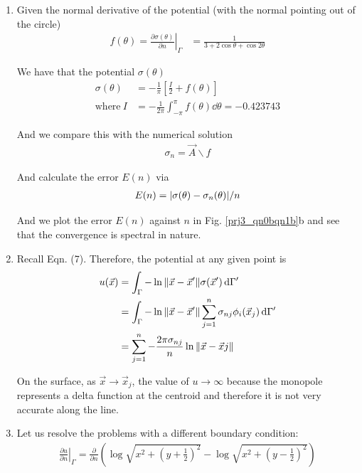 \begin{enumerate}[label=(\alph*),leftmargin=*,itemsep=0mm]
    \item Given the normal derivative of the potential (with the normal pointing out of the circle)
    \begin{align*}
        f(\theta) = \left. \frac{\partial{\sigma}(\theta)}{\partial{n}} \right|_\Gamma
        &= \frac{1}{3+2\cos\theta +\cos2\theta}
    \end{align*}
    
    We have that the potential $\sigma(\theta)$
    \begin{align}
        \sigma(\theta) &= -\frac{1}{\pi} \left[ \frac{I}{2} + f(\theta) \right] \\
        \text{where}\> I &= -\frac{1}{2\pi} \int_{-\pi}^\pi f(\theta) \dd{\theta}
        = -0.423743
    \end{align}
    
    And we compare this with the numerical solution
    \begin{align*}
        \sigma_n = \vec{A} \backslash f
    \end{align*}
    
    And calculate the error $E(n)$ via
    \begin{align*}
        E(n) = \abs{\sigma(\theta)-\sigma_n(\theta)} / n
    \end{align*}
    
    And we plot the error $E(n)$ against $n$ in Fig. \ref{prj3_qn0bqn1b}b and see that the convergence is spectral in nature.
    
    \item Recall Eqn. (7).  Therefore, the potential at any given point is
    \begin{align}
        u(\vec{x}) &= \int_\Gamma -\ln \norm{\vec{x}-\vec{x}'} \sigma(\vec{x}') \dd{\Gamma'} \nonumber \\
        &= \int_\Gamma -\ln \norm{\vec{x}-\vec{x}'} \sum_{j=1}^n \sigma_{nj} \phi_i(\vec{x}_j) \dd{\Gamma'} \nonumber \\
        &= \sum_{j=1}^n -\frac{2\pi\sigma_{nj}}{n} \ln \norm{\vec{x}-\vec{x}j}
    \end{align}
    
    On the surface, as $\vec{x}\rightarrow\vec{x}_j$, the value of $u \rightarrow \infty$ because the monopole represents a delta function at the centroid and therefore it is not very accurate along the line.
    
    \item Let us resolve the problems with a different boundary condition:
    \begin{align}
        \left. \frac{\partial{u}}{\partial{n}} \right|_\Gamma
        = \frac{\partial}{\partial{n}}
        \left( \log \sqrt{x^2 + \left( y + \frac{1}{2} \right)^2}
        - \log \sqrt{x^2 + \left( y - \frac{1}{2} \right)^2} \right)
    \end{align}
    

\end{enumerate}
